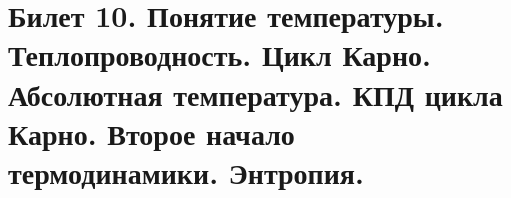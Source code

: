 \newpage
\section{Билет 10. Понятие температуры. Теплопроводность. Цикл Карно. Абсолютная температура. КПД цикла Карно. Второе начало термодинамики. Энтропия.}